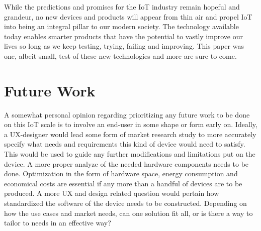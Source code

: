 \iffalse
\begin{itemize}
	\item Critique
	\item Discussion
	\item Don't make the reader do all the work
\end{itemize}
\fi
While the predictions and promises for the IoT industry remain hopeful and grandeur, no new devices and products will appear from thin air and propel IoT into being an integral pillar to our modern society. The technology available today enables smarter products that have the potential to vastly improve our lives so long as we keep testing, trying, failing and improving. This paper was one, albeit small, test of these new technologies and more are sure to come.


\section{Future Work}
A somewhat personal opinion regarding prioritizing any future work to be done on this IoT scale is to involve an end-user in some shape or form early on. Ideally, a UX-designer would lead some form of market research study to more accurately specify what needs and requirements this kind of device would need to satisfy. This would be used to guide any further modifications and limitations put on the device.
A more proper analyze of the needed hardware components needs to be done. Optimization in the form of hardware space, energy consumption and economical costs are essential if any more than a handful of devices are to be produced.
A more UX and design related question would pertain how standardized the software of the device needs to be constructed. Depending on how the use cases and market needs, can one solution fit all, or is there a way to tailor to needs in an effective way?
